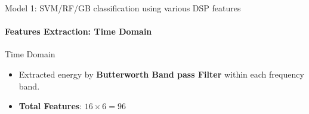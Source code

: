 \documentclass{beamer}
\begin{document}
\begin{frame}{Model 1: SVM/RF/GB classification using various DSP features}
  \framesubtitle{Features Extraction: Time Domain}

  \begin{block}{Time Domain}
    \begin{itemize}
    \item Extracted energy by \textbf{Butterworth Band pass Filter} within each
      frequency band.
    \item \textbf{Total Features}: $16 \times 6 = 96$
    \end{itemize}
    
  \end{block}
  
\end{frame}
\end{document}
